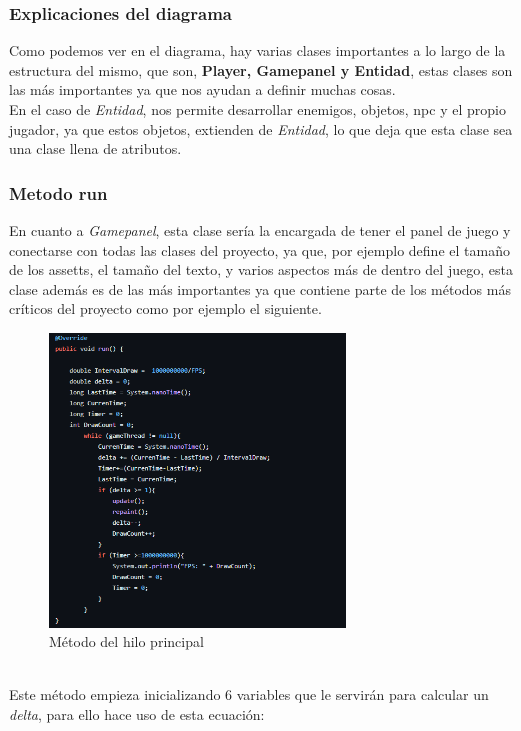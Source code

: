 \documentclass[a4paper]{article}
\begin{document}
\subsubsection{Explicaciones del diagrama}
Como podemos ver en el diagrama, hay varias clases importantes a lo largo de la estructura del mismo, que son, \textbf{Player, Gamepanel y Entidad}, estas clases son las más importantes ya que
nos ayudan a definir muchas cosas.\\
En el caso de \textit{Entidad}, nos permite desarrollar enemigos, objetos, npc y el propio jugador, ya que estos objetos, extienden de \textit{Entidad}, lo que deja que esta clase sea una clase llena de atributos.
\subsubsection{Metodo run}
En cuanto a \textit{Gamepanel}, esta clase sería la encargada de tener el panel de juego y conectarse con todas las clases del proyecto, ya que, por ejemplo define
el tamaño de los assetts, el tamaño del texto, y varios aspectos más de dentro del juego, esta clase además es de las más importantes ya que contiene parte de los métodos más críticos del proyecto como por ejemplo el siguiente.\\
\begin{figure}[ht]
    \centering
    \includegraphics[width=0.7\textwidth]{Images/fpsMethod.PNG}
    \caption{Método del hilo principal}
    \label{fig:metodos}
\end{figure}
\\
Este método empieza inicializando 6 variables que le servirán para calcular un \textit{delta}, para ello hace uso de esta ecuación:
\end{document}
